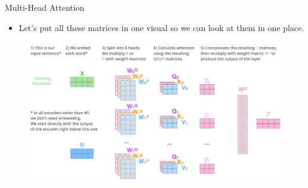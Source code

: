 \documentclass[handout]{beamer}
\begin{document}
\begin{frame}{Multi-Head Attention}

\begin{scriptsize}
\begin{itemize}
 \item Let's put all these matrices in one visual so we can look at them in one place.


\end{itemize}

\end{scriptsize}


     \begin{figure}[h]
        	\includegraphics[scale = 0.226]{pics/transformer_multi-headed_self-attention-recap.png}
        \end{figure}




\end{frame}
\end{document}
